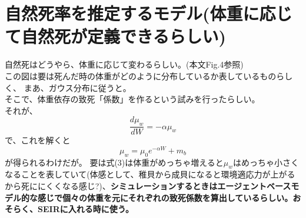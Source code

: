 \documentclass{article}
\begin{document}
\section{自然死率を推定するモデル(体重に応じて自然死が定義できるらしい)}
自然死はどうやら、体重に応じて変わるらしい。(本文Fig.4参照)\\
この図は要は死んだ時の体重がどのように分布しているか表しているものらしく、
まあ、ガウス分布に従うと。\\
そこで、体重依存の致死「係数」を作るという試みを行ったらしい。\\
それが、
\begin{equation}
    \frac{d\mu _w}{dW} = -\alpha \mu _w
\end{equation}
で、これを解くと
\begin{equation}
    \mu _w = \mu _0 e^{-\alpha W} + m_b
\end{equation}
が得られるわけだが。
要は式(3)は体重がめっちゃ増えると$\mu _w$はめっちゃ小さくなることを表していて(体感として、稚貝から成貝になると環境適応力が上がるから死ににくくなる感じ?)、\textbf{シミュレーションするときはエージェントベースモデル的な感じで個々の体重を元にそれぞれの致死係数を算出しているらしい。おそらく、SEIRに入れる時に使う。}
\end{document}
